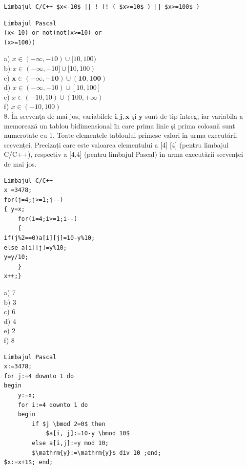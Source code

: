 \documentclass[10pt]{article}
\begin{document}
\begin{verbatim}
Limbajul C/C++ $x<-10$ || ! (! ( $x>=10$ ) || $x>=100$ )
\end{verbatim}

\begin{verbatim}
Limbajul Pascal
(x<-10) or not(not(x>=10) or
(x>=100))
\end{verbatim}

a) $x \in(-\infty,-10) \cup[10,100)$\\
b) $x \in(-\infty,-10] \cup[10,100)$\\
c) $\mathbf{x} \in(-\infty,-\mathbf{1 0}) \cup(\mathbf{1 0}, \mathbf{1 0 0})$\\
d) $x \in(-\infty,-10) \cup[10,100]$\\
e) $x \in(-10,10) \cup(100,+\infty)$\\
f) $x \in(-10,100)$\\
8. În secvenţa de mai jos, variabilele $\mathbf{i}, \mathbf{j}, \mathbf{x}$ şi $\mathbf{y}$ sunt de tip întreg, iar variabila a memorează un tablou bidimensional în care prima linie şi prima coloană sunt numerotate cu 1. Toate elementele tabloului primesc valori în urma executării secvenței. Precizați care este valoarea elementului a [4] [4] (pentru limbajul C/C++), respectiv a [4,4] (pentru limbajul Pascal) în urma executării secvenței de mai jos.

\begin{verbatim}
Limbajul C/C++
x =3478;
for(j=4;j>=1;j--)
{ y=x;
    for(i=4;i>=1;i--)
    {
if(j%2==0)a[i][j]=10-y%10;
else a[i][j]=y%10;
y=y/10;
    }
x++;}
\end{verbatim}

a) 7\\
b) 3\\
c) 6\\
d) 4\\
e) 2\\
f) 8

\begin{verbatim}
Limbajul Pascal
x:=3478;
for j:=4 downto 1 do
begin
    y:=x;
    for i:=4 downto 1 do
    begin
        if $j \bmod 2=0$ then
            $a[i, j]:=10-y \bmod 10$
        else a[i,j]:=y mod 10;
        $\mathrm{y}:=\mathrm{y}$ div 10 ;end;
$x:=x+1$; end;
\end{verbatim}
\end{document}
